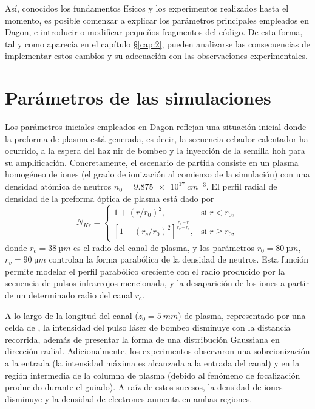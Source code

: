 Así, conocidos los fundamentos físicos y los experimentos realizados hasta el momento, es posible comenzar a explicar los parámetros principales empleados en Dagon, e introducir o modificar pequeños fragmentos del código. De esta forma, tal y como aparecía en el capítulo \S\ref{cap:2}, pueden analizarse las consecuencias de implementar estos cambios y su adecuación con las observaciones experimentales.

\section{Parámetros de las simulaciones}\label{sec:3.4}
Los parámetros iniciales empleados en Dagon reflejan una situación inicial donde la preforma de plasma está generada, es decir, la secuencia cebador-calentador ha ocurrido, a la espera del haz \acrshort{nir} de bombeo y la inyección de la semilla \acrshort{hoh} para su amplificación. Concretamente, el escenario de partida consiste en un plasma homogéneo de iones  (el grado de ionización al comienzo de la simulación) con una densidad atómica de neutros $n_{0} = \qty{9.875e17}{cm^{-3}}$. El perfil radial de densidad de la preforma óptica de plasma está dado por
\begin{equation}\label{eq:3.18}
  N_{Kr} =   
  \begin{cases}
    1 + (r/r_{0})^{2}, & \text{si $r<r_{0}$},\\
    \left[1 + (r_{c}/r_{0})^{2}\right]^{\frac{r_{v}-r}{r_{v}-r_{c}}}, & \text{si $r\ge r_{0}$},
  \end{cases}
\end{equation}
donde $r_{c} = \qty{38}{µm}$ es el radio del canal de plasma, y los parámetros $r_{0} = \qty{80}{µm}$, $r_{v} = \qty{90}{µm}$ controlan la forma parabólica de la densidad de neutros. Esta función permite modelar el perfil parabólico creciente con el radio producido por la secuencia de pulsos infrarrojos mencionada, y la desaparición de los iones a partir de un determinado radio del canal $r_{c}$.

A lo largo de la longitud del canal ($z_{0} = \qty{5}{mm}$) de plasma, representado por una celda de , la intensidad del pulso láser de bombeo disminuye con la distancia recorrida, además de presentar la forma de una distribución Gaussiana en dirección radial. Adicionalmente, los experimentos observaron una sobreionización\autocite{Tuitje2020} a la entrada (la intensidad máxima es alcanzada a la entrada del canal) y en la región intermedia de la columna de plasma (debido al fenómeno de focalización producido durante el guiado). A raíz de estos sucesos, la densidad de iones  disminuye y la densidad de electrones aumenta en ambas regiones.

